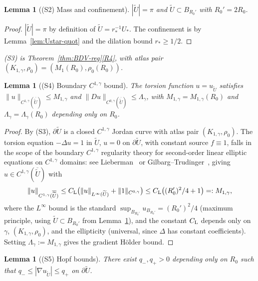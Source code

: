 \documentclass[11pt]{amsart}
\newtheorem{lemma}[theorem]{Lemma}
\newcommand{\wt}{\widetilde}
\begin{document}
\begin{lemma}[(S2) Mass and confinement]\label{lem:S2}
\(|\wt U|=\pi\) and \(\wt U\subset B_{R_0'}\) with \(R_0'=2R_0\).
\end{lemma}

\begin{proof}
\(|\wt U|=\pi\) by definition of \(\wt U=r_*^{-1}U_*\).  The
confinement is by Lemma~\ref{lem:Ustar-quot} and the dilation bound
\(r_*\ge 1/2\).
\end{proof}

\noindent\emph{(S3) is Theorem~\ref{thm:BDV-reg}\ref{R4}, with
atlas pair $(K_{1,\gamma},\rho_0)=(M_1(R_0),\rho_0(R_0))$.}

\begin{lemma}[(S4) Boundary $C^{1,\gamma}$ bound]\label{lem:S4}
The torsion function $u=u_{\wt U}$ satisfies
$\|u\|_{C^{1,\gamma}(\overline{\wt U})}\le M_{1,\gamma}$ and
$\|Du\|_{C^{0,\gamma}(\overline{\wt U})}\le\Lambda_\gamma$, with
$M_{1,\gamma}=M_{1,\gamma}(R_0)$ and $\Lambda_\gamma=
\Lambda_\gamma(R_0)$ depending only on $R_0$.
\end{lemma}

\begin{proof}
By (S3), $\partial\wt U$ is a closed $C^{1,\gamma}$ Jordan curve
with atlas pair $(K_{1,\gamma},\rho_0)$.  The torsion equation
$-\Delta u=1$ in $\wt U$, $u=0$ on $\partial\wt U$, with constant
source $f\equiv 1$, falls in the scope of the boundary
$C^{1,\gamma}$ regularity theory for second-order linear elliptic
equations on $C^{1,\gamma}$ domains: see Lieberman~\cite[Theorem
1]{Li86} or Gilbarg--Trudinger~\cite[Theorem 8.34 + Hölder boundary
upgrade]{GT}, giving $u\in C^{1,\gamma}(\overline{\wt U})$ with
\[
   \|u\|_{C^{1,\gamma}(\overline{\wt U})}
   \le C_{\rm L}\bigl(\|u\|_{L^\infty(\wt U)}+\|1\|_{C^{0,\gamma}}
      \bigr)\le C_{\rm L}\bigl((R_0')^2/4+1\bigr)=:M_{1,\gamma},
\]
where the $L^\infty$ bound is the standard $\sup_{B_{R_0'}}u_{B_{R_0'}}
=(R_0')^2/4$ (maximum principle, using $\wt U\subset B_{R_0'}$ from
Lemma~\ref{lem:S2}), and the constant $C_{\rm L}$ depends
only on $\gamma$, $(K_{1,\gamma},\rho_0)$, and the ellipticity
(universal, since $\Delta$ has constant coefficients).  Setting
$\Lambda_\gamma:=M_{1,\gamma}$ gives the gradient Hölder bound.
\end{proof}

\begin{lemma}[(S5) Hopf bounds]\label{lem:S5}
There exist \(q_-,q_+>0\) depending only on \(R_0\) such that
\(q_-\le|\nabla u_{\wt U}|\le q_+\) on \(\partial\wt U\).
\end{lemma}
\end{document}
